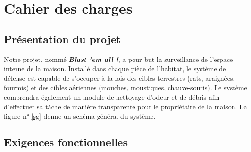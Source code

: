 
\section{Cahier des charges}

\subsection{Présentation du projet}

Notre projet, nommé \textit{\textbf{Blast 'em all !}}, a pour but la
surveillance de l'espace interne de la maison. Installé dans chaque pièce
de l'habitat, le système de défense est capable de s'occuper à la fois des
cibles terrestres (rats, araignées, fourmis) et des cibles aériennes
(mouches, moustiques, chauve-souris). Le système comprendra également un
module de nettoyage d'odeur et de débris afin d'effectuer sa tâche de
manière transparente pour le propriétaire de la maison. La figure n° \ref{sg}
donne un schéma général du système.


\subsection{Exigences fonctionnelles}

